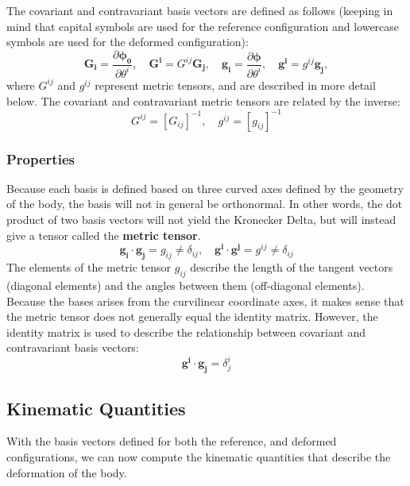 \documentclass[]{spie}  %
\begin{document}
The covariant and contravariant basis vectors are defined as follows (keeping in mind that capital symbols are used for the reference configuration and lowercase symbols are used for the deformed configuration):
\begin{equation}
\bm{G_i} = \frac{\partial \bm{\phi_0}}{\partial \theta^i}, \quad \bm{G^i} = G^{ij}\bm{G_j}, \quad \bm{g_i} = \frac{\partial \bm{\phi}}{\partial \theta^i}, \quad \bm{g^i} = g^{ij}\bm{g_j},
\end{equation}
where $G^{ij}$ and $g^{ij}$ represent metric tensors, and are described in more detail below. The covariant and contravariant metric tensors are related by the inverse:
\begin{equation}
G^{ij} = [G_{ij}]^{-1}, \quad g^{ij} = [g_{ij}]^{-1}
\end{equation}

\subsubsection{Properties}
Because each basis is defined based on three curved axes defined by the geometry of the body, the basis will not in general be orthonormal. In other words, the dot product of two basis vectors will not yield the Kronecker Delta, but will instead give a tensor called the \textbf{metric tensor}.
\begin{equation}
\bm{g_i} \cdot \bm{g_j} = g_{ij} \neq \delta_{ij}, \quad \bm{g^i} \cdot \bm{g^j} = g^{ij} \neq \delta_{ij}
\end{equation}
The elements of the metric tensor $g_{ij}$ describe the length of the tangent vectors (diagonal elements) and the angles between them (off-diagonal elements). Because the bases arises from the curvilinear coordinate axes, it makes sense that the metric tensor does not generally equal the identity matrix. However, the identity matrix is used to describe the relationship between covariant and contravariant basis vectors:
\begin{equation}
\bm{g^i} \cdot \bm{g_j} = \delta^i_j
\end{equation}


\subsection{Kinematic Quantities}
With the basis vectors defined for both the reference, and deformed configurations, we can now compute the kinematic quantities that describe the deformation of the body. 
\end{document}
